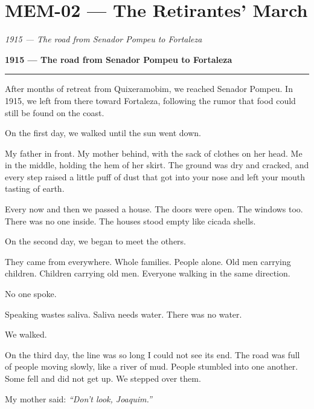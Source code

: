 \section*{\textbf{MEM-02} --- The Retirantes' March}

\noindent \textit{1915 --- The road from Senador Pompeu to Fortaleza}

\noindent \textbf{1915 --- The road from Senador Pompeu to Fortaleza}

\vspace{0.5em}\noindent\rule{\textwidth}{0.5pt}\vspace{0.5em}

\noindent After months of retreat from Quixeramobim, we reached Senador Pompeu. In 1915, we left from there toward Fortaleza, following the rumor that food could still be found on the coast.

\noindent On the first day, we walked until the sun went down.

\noindent My father in front. My mother behind, with the sack of clothes on her head. Me in the middle, holding the hem of her skirt. The ground was dry and cracked, and every step raised a little puff of dust that got into your nose and left your mouth tasting of earth.

\noindent Every now and then we passed a house. The doors were open. The windows too. There was no one inside. The houses stood empty like cicada shells.

\noindent On the second day, we began to meet the others.

\noindent They came from everywhere. Whole families. People alone. Old men carrying children. Children carrying old men. Everyone walking in the same direction.

\noindent No one spoke.

\noindent Speaking wastes saliva. Saliva needs water. There was no water.

\noindent We walked.

\noindent On the third day, the line was so long I could not see its end. The road was full of people moving slowly, like a river of mud. People stumbled into one another. Some fell and did not get up. We stepped over them.

\noindent My mother said: \textit{\textquotedblleft{}Don't look, Joaquim.\textquotedblright{}}

